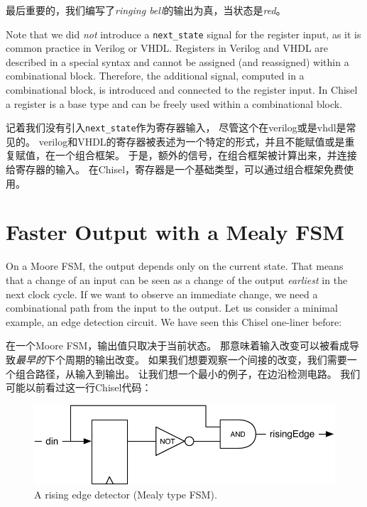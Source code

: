 \documentclass[%
    10pt,
    headinclude, footexclude,
    openright, %
    notitlepage,
    cleardoubleempty,
    headsepline,
    pointlessnumbers,
    bibtotoc, idxtotoc,
    ]{scrbook}
\newcommand{\code}[1]{{\small{\texttt{#1}}}}
\newcommand{\scale}{0.7}
\begin{document}
\noindent 最后重要的，我们编写了\emph{ringing bell}的输出为真，当状态是\emph{red}。


Note that we did \emph{not} introduce a \code{next\_state} signal for the register input,
as it is common practice in Verilog or VHDL.
Registers in Verilog and VHDL are described in a special syntax and cannot
be assigned (and reassigned) within a combinational block.
Therefore, the additional signal, computed in a combinational block, is
introduced and connected to the register input.
In Chisel a register is a base type and can be freely used within a combinational block.

记着我们没有引入\code{next\_state}作为寄存器输入，
尽管这个在verilog或是vhdl是常见的。
verilog和VHDL的寄存器被表述为一个特定的形式，并且不能赋值或是重复赋值，在一个组合框架。
于是，额外的信号，在组合框架被计算出来，并连接给寄存器的输入。
在Chisel，寄存器是一个基础类型，可以通过组合框架免费使用。

\section{Faster Output with a Mealy FSM}

On a Moore FSM, the output depends only on the current state.
That means that a change of an input can be seen as a change of the
output \emph{earliest} in the next clock cycle.
If we want to observe an immediate change, we need a combinational
path from the input to the output.
Let us consider a minimal example, an edge detection circuit.
We have seen this Chisel one-liner before:

在一个Moore FSM，输出值只取决于当前状态。
那意味着输入改变可以被看成导致\emph{最早的}下个周期的输出改变。
如果我们想要观察一个间接的改变，我们需要一个组合路径，从输入到输出。
让我们想一个最小的例子，在边沿检测电路。
我们可能以前看过这一行Chisel代码：


\begin{figure}
  \centering
  \includegraphics[scale=\scale]{figures/fsm-rising}
  \caption{A rising edge detector (Mealy type FSM).}
  \label{fig:fsm-rising}
\end{figure}
\end{document}
